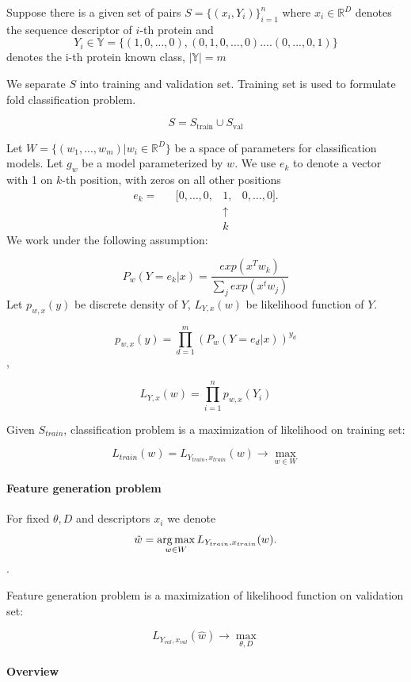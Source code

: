 \documentclass[12pt, twoside]{article}
\begin{document}
Suppose there is a given set of pairs $S = \{ (x_i, Y_i)\}_{i = 1}^n$ where $ x_i \in \mathbb{R}^D$ denotes the sequence descriptor of $i$-th protein and $$Y_i \in \mathbb{Y} = \{ (1, 0, ..., 0), (0, 1, 0, ..., 0) .... (0, ..., 0, 1) \}$$ denotes the i-th protein known class, $|\mathbb{Y}| = m$

We separate $S$ into training and validation set. Training set is used to formulate fold classification problem.  

$$S = S_{\text{train}} \cup S_{\text{val}}$$

Let $W = \{(w_1, ..., w_m)| w_i \in \mathbb{R}^D\}$ be a space of parameters for classification models. Let $g_w$ be a model parameterized by $w$.
We use $e_k$ to denote a vector with 1 on $k$-th position, with zeros on all other positions
\[
\begin{matrix}
e_{k} = &
        &[0,\ldots,0,&1,&0,\dots,0].\\
        &&&\uparrow&      \\
        &&&k&           
\end{matrix}
\]
We work under the following assumption:  

$$P_w(Y = e_k| x) = \frac{exp(x^Tw_k)}{\sum_j exp(x^t w_j)}$$
Let $p_{w, x}(y)$ be discrete density of $Y$, $L_{Y, x}(w)$ be likelihood function of $Y$.  

$$p_{w, x}(y) = \prod_{d = 1}^{m} (P_w(Y = e_d| x))^{y_d}$$, 

$$L_{Y, x}(w) = \prod_{i = 1}^{n} p_{w, x}(Y_i)$$

Given $S_{train}$, classification problem is a maximization of likelihood on training set: 

$$L_{train}(w) = L_{Y_{train}, x_{train}}(w) \rightarrow \max\limits_{w \in W}$$

\paragraph{Feature generation problem}
\noindent

For fixed $\theta, D$ and descriptors $x_i$ we denote $$\hat{w} = \argmax\limits_{w \in W} L_{Y_{train}, x_{train}}(w).$$. 

Feature generation problem is a maximization of likelihood function on validation set:  

$$L_{Y_{val}, x_{val}}(\hat{w}) \rightarrow \max\limits_{\theta, D}$$

\paragraph{Overview}
\noindent
\end{document}
